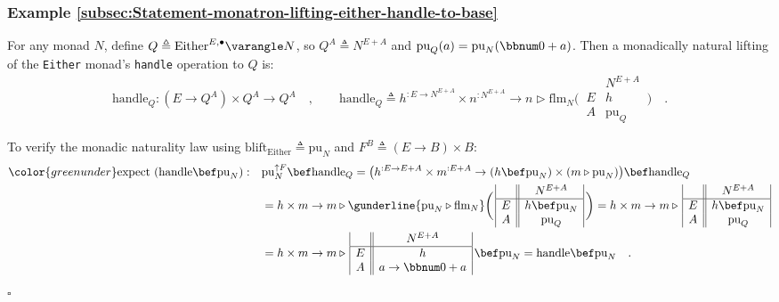 \subsubsection{Example \label{subsec:Statement-monatron-lifting-either-handle-to-base}\ref{subsec:Statement-monatron-lifting-either-handle-to-base}}

For any monad $N$, define $Q\triangleq\text{Either}^{E,\bullet}\varangle N$,
so $Q^{A}\triangleq N^{E+A}$ and $\text{pu}_{Q}(a)=\text{pu}_{N}(\bbnum 0+a)$.
Then a monadically natural lifting of the \lstinline!Either! monad\textsf{'}s
\lstinline!handle! operation to $Q$ is:
\[
\text{handle}_{Q}:(E\rightarrow Q^{A})\times Q^{A}\rightarrow Q^{A}\quad,\quad\quad\text{handle}_{Q}\triangleq h^{:E\rightarrow N^{E+A}}\times n^{:N^{E+A}}\rightarrow n\triangleright\text{flm}_{N}\bigg(\,\begin{array}{|c||c|}
 & N^{E+A}\\
\hline E & h\\
A & \text{pu}_{Q}
\end{array}\,\bigg)\quad.
\]

To verify the monadic naturality law using $\text{blift}_{\text{Either}}\triangleq\text{pu}_{N}$
and $F^{B}\triangleq\left(E\rightarrow B\right)\times B$:
\begin{align*}
{\color{greenunder}\text{expect }(\text{handle}\bef\text{pu}_{N}):}\quad & \text{pu}_{N}^{\uparrow F}\bef\text{handle}_{Q}=\big(h^{:E\rightarrow E+A}\times m^{:E+A}\rightarrow(h\bef\text{pu}_{N})\times(m\triangleright\text{pu}_{N})\big)\bef\text{handle}_{Q}\\
 & =h\times m\rightarrow m\triangleright\gunderline{\text{pu}_{N}\triangleright\text{flm}_{N}}\bigg(\,\begin{array}{|c||c|}
 & N^{E+A}\\
\hline E & h\bef\text{pu}_{N}\\
A & \text{pu}_{Q}
\end{array}\,\bigg)=h\times m\rightarrow m\triangleright\,\begin{array}{|c||c|}
 & N^{E+A}\\
\hline E & h\bef\text{pu}_{N}\\
A & \text{pu}_{Q}
\end{array}\\
 & =h\times m\rightarrow m\triangleright\,\begin{array}{|c||c|}
 & N^{E+A}\\
\hline E & h\\
A & a\rightarrow\bbnum 0+a
\end{array}\,\bef\text{pu}_{N}=\text{handle}\bef\text{pu}_{N}\quad.
\end{align*}
$\square$

